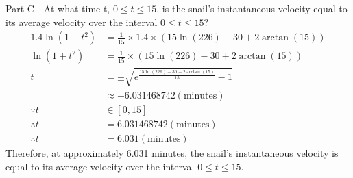 \documentclass{beamer}
\begin{document}
\begin{frame}{Part C - At what time t, $0\leq t\leq 15$, is the snail's instantaneous velocity equal to its average velocity over the interval $0\leq t\leq 15$?}
    \begin{align*}
    1.4\ln(1+t^2) &= \frac{1}{15}\times1.4\times (15\ln(226)-30+2\arctan(15))\\
    \ln(1+t^2) &= \frac{1}{15}\times (15\ln(226)-30+2\arctan(15))\\
    t&=\pm \sqrt{e^{\frac{15\ln(226)-30+2\arctan(15)}{15}}-1}\\
    &\approx\pm 6.031468742 (\text{minutes})\\
    \because t &\in [0,15]\\
    \therefore t &= 6.031468742 (\text{minutes})\\
    \therefore t &= 6.031 (\text{minutes})
    \end{align*}
    Therefore, at approximately 6.031 minutes, the snail's instantaneous velocity is equal to its average velocity over the interval $0\leq t\leq 15$.
\end{frame}
\end{document}
